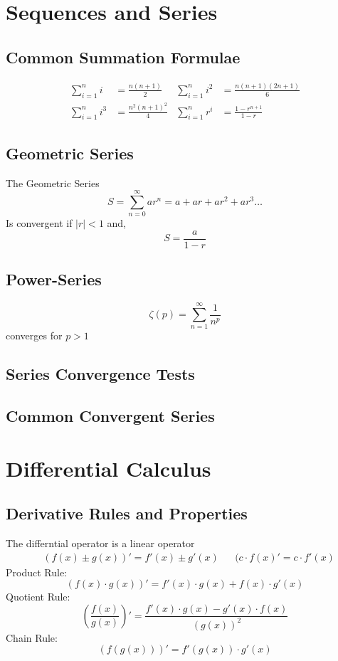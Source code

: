 \documentclass[12pt]{article}
\begin{document}
\section{Sequences and Series}
\subsection{Common Summation Formulae}
\begin{align*}
\sum_{i = 1}^{n} i &= \frac{n(n+1)}{2} & \sum_{i = 1}^{n} i^2 &= \frac{n(n+1)(2n+1)}{6} \\
\sum_{i = 1}^{n}i^3 &= \frac{n^2(n+1)^2}{4} & \sum_{i = 1}^{n}r^i &= \frac{1-r^{n+1}}{1-r}
\end{align*}
\subsection{Geometric Series}
The Geometric Series
$$S = \sum_{n=0}^{\infty}{ar^{n}} = a + ar + ar^2 + ar^3\dots 
$$
Is convergent if $|r|< 1$ and,
$$S = \frac{a}{1-r}$$
\subsection{Power-Series}
$$\zeta(p) = \sum_{n = 1}^{\infty} \frac{1}{n^p}$$
converges for $p>1$
\subsection{Series Convergence Tests}
\subsection{Common Convergent Series}





\section{Differential Calculus}

\subsection{Derivative Rules and Properties}
The differntial operator is a linear operator
\begin{align*}
&{(f(x) \pm g(x))}' = f'(x) \pm g'(x) & &{(c\cdot f(x)}' = c\cdot f'(x)
\end{align*}
Product Rule:
$$(f(x)\cdot g(x))' = f'(x)\cdot g(x) + f(x)\cdot g'(x)$$
Quotient Rule:
$$\left(\frac{f(x)}{g(x)}\right)' = \frac{f'(x)\cdot g(x) - g'(x)\cdot f(x)}{(g(x))^2}$$
Chain Rule:
$$ (f(g(x)))' = f'(g(x))\cdot g'(x)
$$
\end{document}
